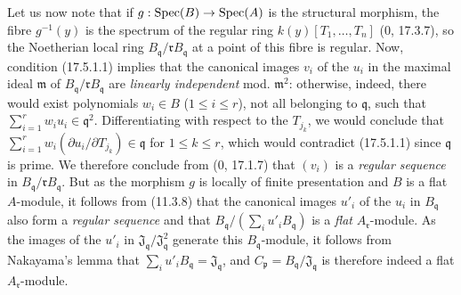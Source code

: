 Let us now note that if $g:\operatorname{Spec}(B)\to\operatorname{Spec}(A)$ is the structural morphism, the fibre $g^{-1}(y)$ is the spectrum of the regular ring $k(y)[T_1,\ldots,T_n]$ (0, 17.3.7), so the Noetherian local ring $B_{\mathfrak q}/\mathfrak rB_{\mathfrak q}$ at a point of this fibre is regular. Now, condition (17.5.1.1) implies that the canonical images $v_i$ of the $u_i$ in the maximal ideal $\mathfrak m$ of $B_{\mathfrak q}/\mathfrak rB_{\mathfrak q}$ are \emph{linearly independent} mod. $\mathfrak m^2$: otherwise, indeed, there would exist polynomials $w_i\in B$ ($1\leq i\leq r$), not all belonging to $\mathfrak q$, such that $\sum_{i=1}^r w_i u_i\in\mathfrak q^2$. Differentiating with respect to the $T_{j_k}$, we would conclude that $\sum_{i=1}^r w_i(\partial u_i/\partial T_{j_k})\in\mathfrak q$ for $1\leq k\leq r$, which would contradict (17.5.1.1) since $\mathfrak q$ is prime. We therefore conclude from (0, 17.1.7) that $(v_i)$ is a \emph{regular sequence} in $B_{\mathfrak q}/\mathfrak rB_{\mathfrak q}$. But as the morphism $g$ is locally of finite presentation and $B$ is a flat $A$-module, it follows from (11.3.8) that the canonical images $u'_i$ of the $u_i$ in $B_{\mathfrak q}$ also form a \emph{regular sequence} and that $B_{\mathfrak q}/(\sum_i u'_iB_{\mathfrak q})$ is a \emph{flat} $A_{\mathfrak r}$-module. As the images of the $u'_i$ in $\mathfrak J_{\mathfrak q}/\mathfrak J_{\mathfrak q}^2$ generate this $B_{\mathfrak q}$-module, it follows from Nakayama's lemma that $\sum_i u'_iB_{\mathfrak q}=\mathfrak J_{\mathfrak q}$, and $C_{\mathfrak p}=B_{\mathfrak q}/\mathfrak J_{\mathfrak q}$ is therefore indeed a flat $A_{\mathfrak r}$-module.

